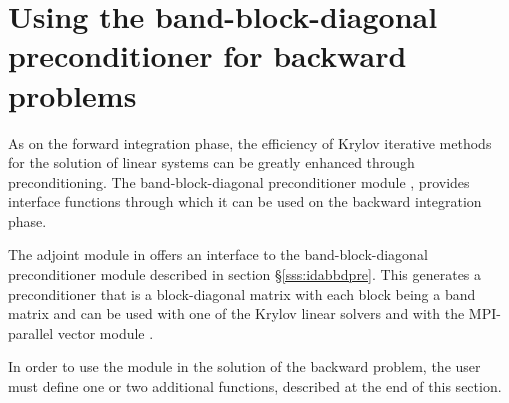 \section{Using the band-block-diagonal preconditioner for backward problems}

As on the forward integration phase, the efficiency of Krylov iterative methods
for the solution of linear systems can be greatly enhanced through preconditioning.
The band-block-diagonal preconditioner module {\idabbdpre},
provides interface functions through which it can be used on the backward integration phase.

The adjoint module in {\idas} offers an interface to the band-block-diagonal
preconditioner module {\idabbdpre} described in section \S\ref{sss:idabbdpre}.
This generates a preconditioner that is a block-diagonal matrix with each
block being a band matrix and can be used with one of the Krylov linear solvers
and with the MPI-parallel vector module {\nvecp}.

In order to use the {\idabbdpre} module in the solution of the backward problem,
the user must define one or two additional functions, described at the end of this section.

